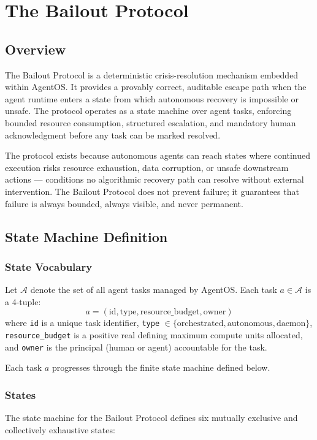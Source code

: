\section{The Bailout Protocol}

\subsection{Overview}
The Bailout Protocol is a deterministic crisis-resolution mechanism embedded within AgentOS. It provides a provably correct, auditable escape path when the agent runtime enters a state from which autonomous recovery is impossible or unsafe. The protocol operates as a state machine over agent tasks, enforcing bounded resource consumption, structured escalation, and mandatory human acknowledgment before any task can be marked resolved.

The protocol exists because autonomous agents can reach states where continued execution risks resource exhaustion, data corruption, or unsafe downstream actions — conditions no algorithmic recovery path can resolve without external intervention. The Bailout Protocol does not prevent failure; it guarantees that failure is always bounded, always visible, and never permanent.

\subsection{State Machine Definition}

\subsubsection{State Vocabulary}
Let $\mathcal{A}$ denote the set of all agent tasks managed by AgentOS. Each task $a \in \mathcal{A}$ is a 4-tuple:
\[
a = (\text{id}, \text{type}, \text{resource\_budget}, \text{owner})
\]
where \texttt{id} is a unique task identifier, \texttt{type} $\in \{\text{orchestrated}, \text{autonomous}, \text{daemon}\}$, \texttt{resource\_budget} is a positive real defining maximum compute units allocated, and \texttt{owner} is the principal (human or agent) accountable for the task.

Each task $a$ progresses through the finite state machine defined below.

\subsubsection{States}
The state machine for the Bailout Protocol defines six mutually exclusive and collectively exhaustive states:

